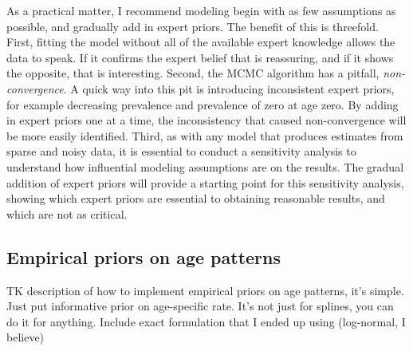 As a practical matter, I recommend modeling begin with as few
assumptions as possible, and gradually add in expert priors. The
benefit of this is threefold.  First, fitting the model without all of
the available expert knowledge allows the data to speak.  If it
confirms the expert belief that is reassuring, and if it shows the
opposite, that is interesting. Second, the MCMC algorithm has a
pitfall, \emph{non-convergence}. A quick way into this pit is
introducing inconsistent expert priors, for example decreasing
prevalence and prevalence of zero at age zero. By adding in expert
priors one at a time, the inconsistency that caused non-convergence
will be more easily identified. Third, as with any model that produces
estimates from sparse and noisy data, it is essential to conduct a
sensitivity analysis to understand how influential modeling
assumptions are on the results.  The gradual addition of expert priors
will provide a starting point for this sensitivity analysis, showing
which expert priors are essential to obtaining reasonable results, and
which are not as critical.

\subsection{Empirical priors on age patterns}
TK description of how to implement empirical priors on age patterns,
it's simple.  Just put informative prior on age-specific rate.
It's not just for splines, you can do it for anything.  Include
exact formulation that I ended up using (log-normal, I believe)
